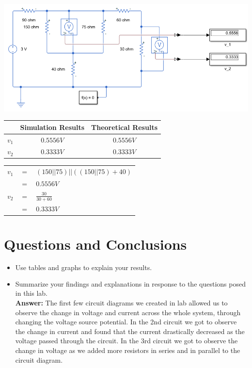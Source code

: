 \documentclass[a4paper]{article}
\begin{document}
\begin{itemize}
	      \includegraphics[scale=0.5]{circuit-3.png} \\      
	      \begin{tabular}{|c|c|c|}
	      	\hline
	      	        & Simulation Results & Theoretical Results \\
	      	\hline
	      	$v_{1}$ & $0.5556V$          & $0.5556V$           \\
	      	\hline
	      	$v_{2}$ & $0.3333V$          & $0.3333V$           \\
	      	\hline
	      \end{tabular} 
	      \begin{tabular}{rcl}
	      	$v_{1}$ & $=$ & $(150 ||75)||((150||75) + 40)$ \\
	      	        & $=$ & $0.5556V$                      \\
	      	$v_{2}$ & $=$ & $\frac{30}{30 + 60}$           \\
	      	        & $=$ & $0.3333V$                      \\
	      \end{tabular}
\end{itemize}

\section*{Questions and Conclusions}
\begin{itemize}
	\item Use tables and graphs to explain your results.
	\item Summarize your findings and explanations in response to the questions posed in this lab. \\
	\textbf{Answer:} The first few circuit diagrams we created in lab allowed us to observe the change in voltage and current across the whole system, through changing the voltage source potential. In the 2nd circuit we got to observe the change in current and found that the current drastically decreased as the voltage passed through the circuit. In the 3rd circuit we got to observe the change in voltage as we added more resistors in series and in parallel to the circuit diagram. 
\end{itemize}

  
\end{document}

